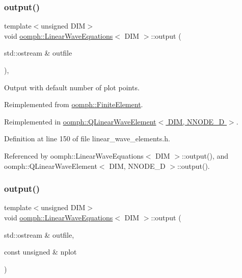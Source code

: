 \subsubsection{\texorpdfstring{output()}{output()}\hspace{0.1cm}{\footnotesize\ttfamily [1/4]}}
{\footnotesize\ttfamily template$<$unsigned D\+IM$>$ \\
void \hyperlink{classoomph_1_1LinearWaveEquations}{oomph\+::\+Linear\+Wave\+Equations}$<$ D\+IM $>$\+::output (\begin{DoxyParamCaption}\item[{std\+::ostream \&}]{outfile }\end{DoxyParamCaption})\hspace{0.3cm}{\ttfamily [inline]}, {\ttfamily [virtual]}}



Output with default number of plot points. 



Reimplemented from \hyperlink{classoomph_1_1FiniteElement_a2ad98a3d2ef4999f1bef62c0ff13f2a7}{oomph\+::\+Finite\+Element}.



Reimplemented in \hyperlink{classoomph_1_1QLinearWaveElement_ae7176ab05b31f360cc7c774e857242d9}{oomph\+::\+Q\+Linear\+Wave\+Element$<$ D\+I\+M, N\+N\+O\+D\+E\+\_\+D $>$}.



Definition at line 150 of file linear\+\_\+wave\+\_\+elements.\+h.



Referenced by oomph\+::\+Linear\+Wave\+Equations$<$ D\+I\+M $>$\+::output(), and oomph\+::\+Q\+Linear\+Wave\+Element$<$ D\+I\+M, N\+N\+O\+D\+E\+\_\+D $>$\+::output().

\mbox{\label{classoomph_1_1LinearWaveEquations_a1830b4405d4ab215e91e01914dd426f3}} 
\subsubsection{\texorpdfstring{output()}{output()}\hspace{0.1cm}{\footnotesize\ttfamily [2/4]}}
{\footnotesize\ttfamily template$<$unsigned D\+IM$>$ \\
void \hyperlink{classoomph_1_1LinearWaveEquations}{oomph\+::\+Linear\+Wave\+Equations}$<$ D\+IM $>$\+::output (\begin{DoxyParamCaption}\item[{std\+::ostream \&}]{outfile,  }\item[{const unsigned \&}]{nplot }\end{DoxyParamCaption})\hspace{0.3cm}{\ttfamily [virtual]}}



